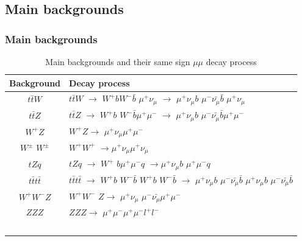 \documentclass[11pt]{beamer}
\begin{document}

\begin{frame}\subsection{Main backgrounds}
\frametitle{Main backgrounds}
\tiny
\begin{table}
	\caption*{Main backgrounds and their same sign $\mu\mu$ decay process }
	\centering
	\begin{tabular}{|c|l|}
		\hline
		Background & Decay process \\
		\hline
		$t\bar{t}W$ &$t\bar{t}W$ $\rightarrow$ $W^+ b W^- \bar{b}$ $\mu^+\nu_\mu$ $\rightarrow$ $\mu^+ \nu_\mu b$ $\mu^- \bar{\nu_\mu} \bar{b}$ $\mu^+ \nu_\mu$\\
		\hline
		$t\bar{t} Z$ & $t\bar{t} Z$ $\rightarrow$ $W^+ b$ $W^-\bar{b} \mu^+ \mu^-$ $\rightarrow$ $\mu^+ \nu_\mu b$ $\mu^- \bar{\nu_\mu} \bar{b}\mu^+ \mu^-$ \\
		\hline
		$W^+ Z$ &$W^+ Z \rightarrow$ $\mu^+ \nu_\mu \mu^+ \mu^-$ \\
		\hline 
		$W^\pm$ $W^\pm$ & $W^+W^+$ $\rightarrow$$\mu^+\nu_\mu$$\mu^+ {\nu_\mu}$ \\
		\hline 
		$tZq$ & $tZq$ $\rightarrow$ $W^+$ $ b\mu^+ \mu^- q$ $\rightarrow$$\mu^+ \nu_\mu b$ $\mu^+\mu^- q$ \\
		\hline 
		$t\bar{t}t\bar{t}$ &$t\bar{t}t\bar{t}$ $\rightarrow$ $W^+ b$ $W^- \bar{b}$ $W^+ b$ $W^- \bar{b}$ $\rightarrow$ $\mu^+ \nu_\mu b$ $\mu^- \bar{\nu_\mu} \bar{b}$ $\mu^+ \nu_\mu b$ $\mu^- \bar{\nu_\mu} \bar{b}$ \\
		\hline 
		$W^+ W^- Z$ & $W^+ W^-$ $Z \rightarrow$ $\mu^+ \nu_\mu$ $\mu^- \bar{\nu_\mu} \mu^+ \mu^-$\\
		\hline 
		$ZZZ$ & $ZZZ \rightarrow$ $\mu^+ \mu^-\mu^+ \mu^-l^+ l^-$ \\
$$
\end{tabular}
\end{table}
\end{frame}
\end{document}

